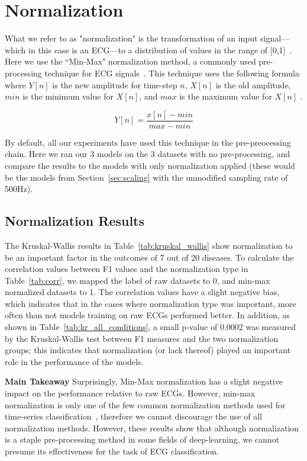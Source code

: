 \documentclass[pmlr,twocolumn]{jmlr}%
\begin{document}
\section{Normalization}
\label{sec:Norm}
What we refer to as "normalization" is the transformation of an input signal---which in this case is an ECG---to a distribution of values in the range of [0,1]~\citep{hong2022practical}. Here we use the ``Min-Max" normalization method, a commonly used pre-processing technique for ECG signals~\citep{uwaechia2021comprehensive,li2010robust,li2019identifying,fang2009human}. This technique uses the following formula where $Y[n]$ is the new amplitude for time-step $n$, $X[n]$ is the old amplitude, $min$ is the minimum value for $X[n]$, and $max$ is the maximum value for $X[n]$ \citep{uwaechia2021comprehensive}.

\[ Y[n] = \frac{x[n]-min}{max-min} \]

By default, all our experiments have used this technique in the pre-preocessing chain. Here we ran our 3 models on the 3 datasets with no pre-processing, and compare the results to the models with only normalization applied (these would be the models from Section~\ref{sec:scaling} with the unmodified sampling rate of 500Hz). 

\subsection{Normalization Results}
The Kruskal-Wallis results in Table~\ref{tab:kruskal_wallis} show normalization to be an important factor in the outcomes of 7 out of 20 diseases. To calculate the correlation values between F1 values and the normalization type in Table~\ref{tab:corr}, we mapped the label of raw datasets to 0, and min-max normalized datasets to 1. The correlation values have a slight negative bias, which indicates that in the cases where normalization type was important, more often than not models training on raw ECGs performed better. In addition, as shown in Table~\ref{tab:kr_all_conditions}, a small p-value of 0.0002 was measured by the Kruskal-Wallis test between F1 measures and the two normalization groups; this indicates that normalization (or lack thereof) played an important role in the performance of the models. 

\textbf{Main Takeaway} Surprisingly, Min-Max normalization has a slight negative impact on the performance relative to raw ECGs. However, min-max normalization is only one
of the few common normalization methods used for time-series classification~\citep{uwaechia2021comprehensive}, therefore we cannot discourage the use of all normalization methods. However, these results show that although normalization is a staple pre-processing method in some fields of deep-learning, we cannot presume its effectiveness for the task of ECG classification.
\end{document}
